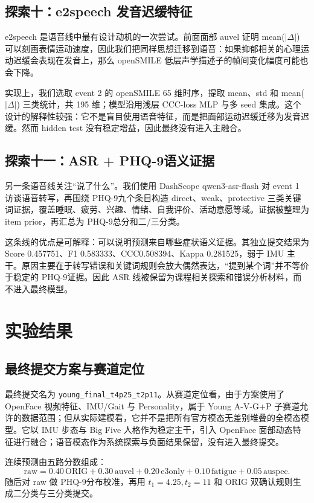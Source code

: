 \documentclass[UTF8,zihao=-4,fontset=windows]{ctexart}
\newcommand{\code}[1]{\texttt{#1}}
\newcommand{\phq}{PHQ-9}
\newcommand{\ccc}{CCC}
\begin{document}
\subsection{探索十：e2speech 发音迟缓特征}

e2speech 是语音线中最有设计动机的一次尝试。前面面部 auvel 证明 mean($|\Delta|$) 可以刻画表情运动速度，因此我们把同样思想迁移到语音：如果抑郁相关的心理运动迟缓会表现在发音上，那么 openSMILE 低层声学描述子的帧间变化幅度可能也会下降。

实现上，我们选取 event 2 的 openSMILE 65 维时序，提取 mean、std 和 mean($|\Delta|$) 三类统计，共 195 维；模型沿用浅层 \ccc-loss MLP 与多 seed 集成。这个设计的解释性较强：它不是盲目使用语音特征，而是把面部运动迟缓迁移为发音迟缓。然而 hidden test 没有稳定增益，因此最终没有进入主融合。

\subsection{探索十一：ASR + \phq 语义证据}

另一条语音线关注“说了什么”。我们使用 DashScope qwen3-asr-flash 对 event 1 访谈语音转写，再围绕 \phq 九个条目构造 direct、weak、protective 三类关键词证据，覆盖睡眠、疲劳、兴趣、情绪、自我评价、活动意愿等域。证据被整理为 item prior，再汇总为 \phq 总分和二/三分类。

这条线的优点是可解释：可以说明预测来自哪些症状语义证据。其独立提交结果为 Score 0.457751、F1 0.583333、\ccc 0.508394、Kappa 0.281525，弱于 IMU 主干。原因主要在于转写错误和关键词规则会放大偶然表达，“提到某个词”并不等价于稳定的 \phq 证据。因此 ASR 线被保留为课程相关探索和错误分析材料，而不进入最终模型。

\section{实验结果}

\subsection{最终提交方案与赛道定位}

最终提交名为 \code{young\_final\_t4p25\_t2p11}。从赛道定位看，由于方案使用了 OpenFace 视频特征、IMU/Gait 与 Personality，属于 Young A-V-G+P 子赛道允许的数据范围；但从实际建模看，它并不是把所有官方模态无差别堆叠的全模态模型。它以 IMU 步态与 Big Five 人格作为稳定主干，引入 OpenFace 面部动态特征进行融合；语音模态作为系统探索与负面结果保留，没有进入最终提交。

连续预测由五路分数组成：
\[
\mathrm{raw}=0.40\,\mathrm{ORIG}+0.30\,\mathrm{auvel}+0.20\,\mathrm{e3only}+0.10\,\mathrm{fatigue}+0.05\,\mathrm{auspec}.
\]
随后对 raw 做 \phq 分布校准，再用 $t_1=4.25,t_2=11$ 和 ORIG 双确认规则生成二分类与三分类提交。
\end{document}
